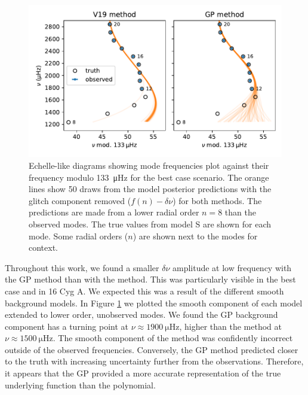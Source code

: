 \begin{figure}[!tb]
    \centering
    \includegraphics{figures/glitch-test-smooth.pdf}
    \caption{Echelle-like diagrams showing mode frequencies plot against their frequency modulo \SI{133}{\micro\hertz} for the best case scenario. The orange lines show 50 draws from the model posterior predictions with the glitch component removed (\(f(n) - \delta\nu\)) for both methods. The predictions are made from a lower radial order \(n=8\) than the observed modes. The true values from model S are shown for each mode. Some radial orders (\(n\)) are shown next to the modes for context.}
    \label{fig:best-smooth}
\end{figure}

Throughout this work, we found a smaller \(\delta\nu\) amplitude at low frequency with the GP method than with the  method. This was particularly visible in the best case and in 16 Cyg A. We expected this was a result of the different smooth background models. In Figure \ref{fig:best-smooth} we plotted the smooth component of each model extended to lower order, unobserved modes. We found the GP background component has a turning point at \(\nu \approx \SI{1900}{\micro\hertz}\), higher than the  method at \(\nu \approx \SI{1500}{\micro\hertz}\). The smooth component of the  method was confidently incorrect outside of the observed frequencies. Conversely, the GP method predicted closer to the truth with increasing uncertainty further from the observations. Therefore, it appears that the GP provided a more accurate representation of the true underlying function than the polynomial.


